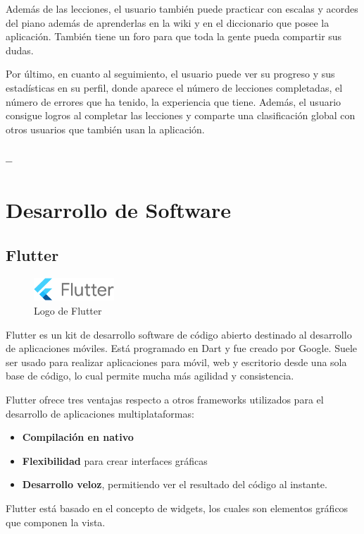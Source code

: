     Además de las lecciones, el usuario también puede practicar con escalas y acordes del piano además de aprenderlas en la wiki y en el diccionario que 
    posee la aplicación. También tiene un foro para que toda la gente pueda compartir sus dudas.

    Por último, en cuanto al seguimiento, el usuario puede ver su progreso y sus estadísticas en su perfil, donde aparece el número de lecciones
    completadas, el número de errores que ha tenido, la experiencia que tiene. Además, el usuario consigue logros al completar las lecciones y 
    comparte una clasificación global con otros usuarios que también usan la aplicación.

    \subsubsection{--}

  



    \section{Desarrollo de Software}
\subsection{Flutter}
\begin{figure}
    \vspace*{-0.4cm}
    \centering
    \includegraphics[width=0.27\textwidth]{imagenes/c2/flutter.png}
    
    \caption{Logo de Flutter}
\end{figure}Flutter es un kit de desarrollo software de código abierto destinado al desarrollo de aplicaciones móviles. Está programado en Dart y fue creado por Google.
Suele ser usado para realizar aplicaciones para móvil, web y escritorio desde una sola base de código, lo cual permite mucha más agilidad y consistencia.

Flutter ofrece tres ventajas respecto a otros frameworks utilizados para el desarrollo de aplicaciones multiplataformas:

\begin{itemize}
    \item \textbf{Compilación en nativo}
    \item \textbf{Flexibilidad} para crear interfaces gráficas
    \item \textbf{Desarrollo veloz}, permitiendo ver el resultado del código al instante.

\end{itemize}
Flutter está basado en el concepto de widgets, los cuales son elementos gráficos que componen la vista. 

